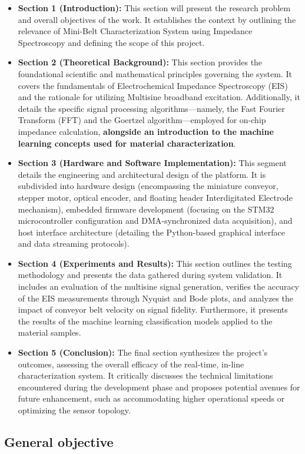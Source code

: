 \begin{itemize}
    \item \textbf{Section 1 (Introduction):} This section will present the research problem and overall objectives of the work. It establishes the context by outlining the relevance of Mini-Belt Characterization System using Impedance Spectroscopy and defining the scope of this project.

    \item \textbf{Section 2 (Theoretical Background):} This section provides the foundational scientific and mathematical principles governing the system. It covers the fundamentals of Electrochemical Impedance Spectroscopy (EIS) and the rationale for utilizing Multisine broadband excitation. Additionally, it details the specific signal processing algorithms—namely, the Fast Fourier Transform (FFT) and the Goertzel algorithm—employed for on-chip impedance calculation, \textbf{alongside an introduction to the machine learning concepts used for material characterization}.
    
    \item \textbf{Section 3 (Hardware and Software Implementation):} This segment details the engineering and architectural design of the platform. It is subdivided into hardware design (encompassing the miniature conveyor, stepper motor, optical encoder, and floating header Interdigitated Electrode mechanism), embedded firmware development (focusing on the STM32 microcontroller configuration and DMA-synchronized data acquisition), and host interface architecture (detailing the Python-based graphical interface and data streaming protocols).
    
    \item \textbf{Section 4 (Experiments and Results):} This section outlines the testing methodology and presents the data gathered during system validation. It includes an evaluation of the multisine signal generation, verifies the accuracy of the EIS measurements through Nyquist and Bode plots, and analyzes the impact of conveyor belt velocity on signal fidelity. Furthermore, it presents the results of the machine learning classification models applied to the material samples.
    
    \item \textbf{Section 5 (Conclusion):} The final section synthesizes the project's outcomes, assessing the overall efficacy of the real-time, in-line characterization system. It critically discusses the technical limitations encountered during the development phase and proposes potential avenues for future enhancement, such as accommodating higher operational speeds or optimizing the sensor topology.
\end{itemize}

\subsection{General objective}
